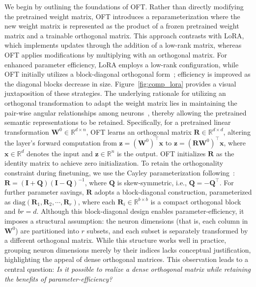We begin by outlining the foundations of OFT. Rather than directly modifying the pretrained weight matrix, OFT introduces a reparameterization where the new weight matrix is represented as the product of a frozen pretrained weight matrix and a trainable orthogonal matrix. This approach contrasts with LoRA, which implements updates through the addition of a low-rank matrix, whereas OFT applies modifications by multiplying with an orthogonal matrix. For enhanced parameter efficiency, LoRA employs a low-rank configuration, while OFT initially utilizes a block-diagonal orthogonal form~\cite{qiu2023controlling}; efficiency is improved as the diagonal blocks decrease in size. Figure~\ref{fig:comp_lora} provides a visual juxtaposition of these strategies. The underlying rationale for utilizing an orthogonal transformation to adapt the weight matrix lies in maintaining the pair-wise angular relationships among neurons~\cite{liu2018learning,liu2021orthogonal,qiu2023controlling}, thereby allowing the pretrained semantic representations to be retained. Specifically, for a pretrained linear transformation $\bm{W}^0\in\mathbb{R}^{d\times n}$, OFT learns an orthogonal matrix $\bm{R}\in\mathbb{R}^{d\times d}$, altering the layer’s forward computation from $\bm{z}=(\bm{W}^0)^\top\bm{x}$ to $\bm{z}=(\bm{R}\bm{W}^0)^\top\bm{x}$, where $\bm{x}\in\mathbb{R}^d$ denotes the input and $\bm{z}\in\mathbb{R}^n$ is the output. OFT initializes $\bm{R}$ as the identity matrix to achieve zero initialization. To retain the orthogonality constraint during finetuning, we use the Cayley parameterization following~\cite{qiu2023controlling,liu2021orthogonal}: $\bm{R}=(\bm{I}+\bm{Q})(\bm{I}-\bm{Q})^{-1}$, where $\bm{Q}$ is skew-symmetric, i.e., $\bm{Q}=-\bm{Q}^\top$. For further parameter savings, $\bm{R}$ adopts a block-diagonal construction, parameterized as $\text{diag}(\bm{R}_1,\bm{R}_2,\cdots,\bm{R}_r)$, where each $\bm{R}_i\in\mathbb{R}^{b\times b}$ is a compact orthogonal block and $br=d$. Although this block-diagonal design enables parameter-efficiency, it imposes a structural assumption: the neuron dimensions (that is, each column in $\bm{W}^0$) are partitioned into $r$ subsets, and each subset is separately transformed by a different orthogonal matrix. While this structure works well in practice, grouping neuron dimensions merely by their indices lacks conceptual justification, highlighting the appeal of dense orthogonal matrices. This observation leads to a central question: \emph{Is it possible to realize a dense orthogonal matrix while retaining the benefits of parameter-efficiency?}


